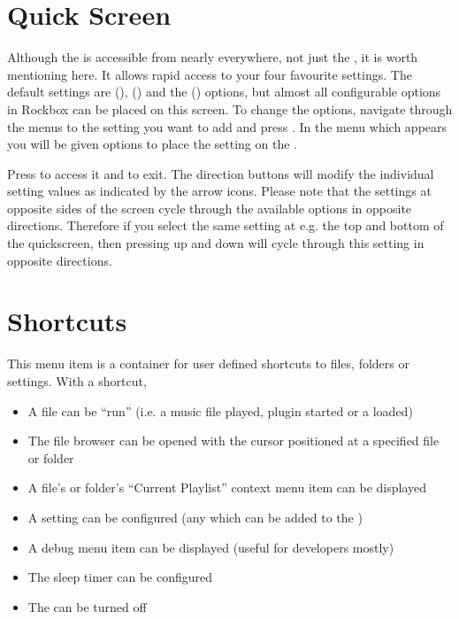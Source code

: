 {
\section{\label{ref:QuickScreen}Quick Screen}
  Although the  is accessible from nearly everywhere,
  not just the , it is worth mentioning here.  It allows
  rapid access to your four favourite settings.  The default settings are
   (),
   () and the
   () options, but almost all
  configurable options in Rockbox can be placed on this screen.  To change the
  options, navigate through the menus to the setting you want to add and press
  \ActionStdContext.  In the menu which appears you will be given options
  to place the setting on the .
  
  Press \ActionStdQuickScreen{} to access it and \ActionQuickScreenExit{} to exit.
  The direction buttons will modify the individual setting values as indicated 
  by the arrow icons. Please note that the settings at opposite sides of the
   screen cycle through the available options in opposite directions.
   Therefore if you select the same setting at e.g. the top and bottom of the
   quickscreen, then pressing up and down will cycle through this setting in
   opposite directions.
}

\section{\label{ref:MainMenuShortcuts}Shortcuts}

This menu item is a container for user defined shortcuts to files, folders or
settings. With a shortcut,
\begin{itemize}
  \item A file can be ``run'' (i.e. a music file played, plugin started or
        a  loaded)
  \item The file browser can be opened with the cursor positioned at
        a specified file or folder
  \item A file's or folder's ``Current Playlist'' context menu item can
        be displayed
  \item A setting can be configured (any which can be added to the
        )
  \item A debug menu item can be displayed (useful for developers mostly)
  \item The sleep timer can be configured
  \item The \dap{} can be turned off
\end{itemize}


